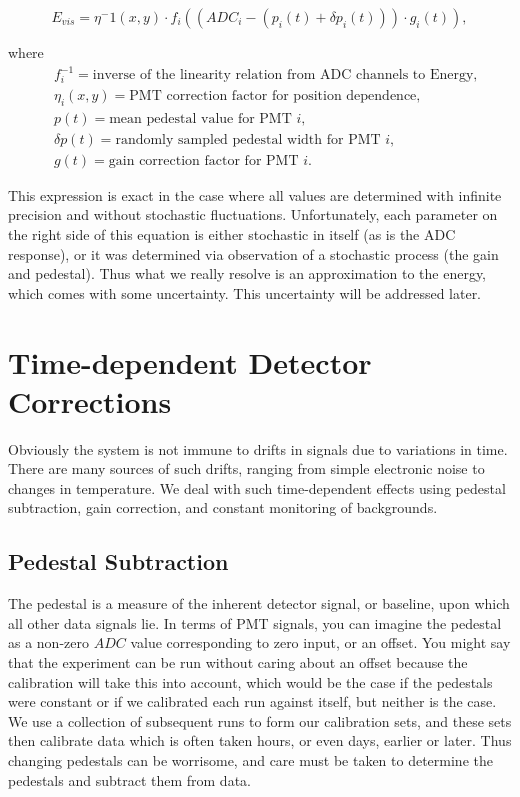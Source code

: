 \begin{equation} \label{eq:EvisResponse}
E_{vis} = \eta^-1(x,y) \cdot f_i\left( \left( ADC_i - (p_i(t) + \delta p_i(t))\right) \cdot g_i(t) \right)  ,
\end{equation}

\noindent where 
\begin{align*}
&f_i^{-1} = \textrm{inverse of the linearity relation from ADC channels to Energy,}\\
&\eta_i(x,y) = \textrm{PMT correction factor for position dependence,} \\
&p(t) = \textrm{mean pedestal value for PMT } i,\\
&\delta p(t) = \textrm{randomly sampled pedestal width for PMT }i,\\
&g(t) = \textrm{gain correction factor for PMT }i.
\end{align*}

This expression is exact in the case where all values are determined with infinite
precision and without stochastic fluctuations. Unfortunately, each parameter on the right
side of this equation is either stochastic in itself (as is the ADC response), or it was
determined via observation of a stochastic process (the gain and pedestal). Thus what we
really resolve is an approximation to the energy, which comes with some uncertainty. This
uncertainty will be addressed later.


\section{Time-dependent Detector Corrections}

Obviously the system is not immune to drifts in signals due to variations
in time. There are many sources of such drifts, ranging from simple
electronic noise to changes in temperature. We deal with such time-dependent
effects using pedestal subtraction, gain correction, and constant monitoring
of backgrounds.

\subsection{Pedestal Subtraction}
The pedestal is a measure of the inherent detector signal, or baseline, 
upon which all other data signals lie. In terms of PMT signals, you can imagine 
the pedestal as a non-zero $ADC$ value corresponding to zero input, or an offset.
You might say that the experiment can be run without caring about an offset
because the calibration will take this into account, which would be the case 
if the pedestals were constant or if we calibrated each run against itself, but 
neither is the case. We use a collection of subsequent runs to form our 
calibration sets, and these sets then calibrate data which is often taken hours,
or even days, earlier or later. Thus changing pedestals can be worrisome, and care
must be taken to determine the pedestals and subtract them from data.

